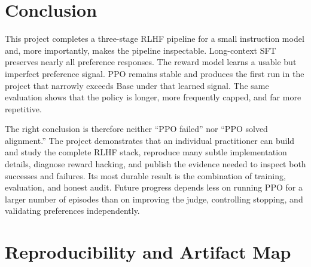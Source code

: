 \documentclass[11pt]{article}
\begin{document}
\section{Conclusion}

This project completes a three-stage RLHF pipeline for a small instruction
model and, more importantly, makes the pipeline inspectable. Long-context SFT
preserves nearly all preference responses. The reward model learns a usable
but imperfect preference signal. PPO remains stable and produces the first
run in the project that narrowly exceeds Base under that learned signal. The
same evaluation shows that the policy is longer, more frequently capped, and
far more repetitive.

The right conclusion is therefore neither ``PPO failed'' nor ``PPO solved
alignment.'' The project demonstrates that an individual practitioner can
build and study the complete RLHF stack, reproduce many subtle implementation
details, diagnose reward hacking, and publish the evidence needed to inspect
both successes and failures. Its most durable result is the combination of
training, evaluation, and honest audit. Future progress depends less on
running PPO for a larger number of episodes than on improving the judge,
controlling stopping, and validating preferences independently.

\appendix

\section{Reproducibility and Artifact Map}
\end{document}
